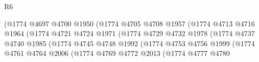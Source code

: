\begin{lexlean}{R6}
\begin{coremodule}
                                            (@1774
                                              @4697
                                              @4700
                                              @1950
                                              (@1774
                                                @4705
                                                @4708
                                                @1957
                                                (@1774
                                                  @4713
                                                  @4716
                                                  @1964
                                                  (@1774
                                                    @4721
                                                    @4724
                                                    @1971
                                                    (@1774
                                                      @4729
                                                      @4732
                                                      @1978
                                                      (@1774
                                                        @4737
                                                        @4740
                                                        @1985
                                                        (@1774
                                                          @4745
                                                          @4748
                                                          @1992
                                                          (@1774
                                                            @4753
                                                            @4756
                                                            @1999
                                                            (@1774
                                                              @4761
                                                              @4764
                                                              @2006
                                                              (@1774
                                                                @4769
                                                                @4772
                                                                @2013
                                                                (@1774
                                                                  @4777
                                                                  @4780

\end{coremodule}
\end{lexlean}
